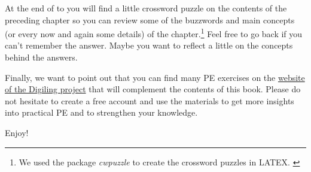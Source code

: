At the end of  to  you will find a little crossword puzzle on the contents of the preceding chapter so you can review some of the buzzwords and main concepts (or every now and again some details) of the chapter.\footnote{We used the package \textit{cwpuzzle} to create the crossword puzzles in LATEX. \citep{neugebauer_latex_2020}} Feel free to go back if you can't remember the answer. Maybe you want to reflect a little on the concepts behind the answers.

Finally, we want to point out that you can find many PE exercises on the \href{https://learn.digiling.eu}{website of the Digiling project} that will complement the contents of this book. Please do not hesitate to create a free account and use the materials to get more insights into practical PE and to strengthen your knowledge.

\bigskip

Enjoy!

